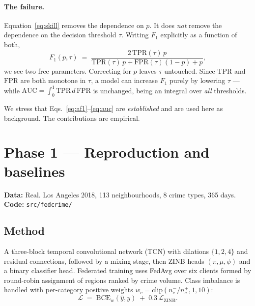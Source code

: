 \documentclass[11pt,a4paper]{article}
\newcommand{\datatag}[2]{%
  \begin{center}\small
  \colorbox{boxbg}{\parbox{0.965\linewidth}{\textbf{Data:} #1 \\ \textbf{Code:} \texttt{#2}}}
  \end{center}}
\begin{document}
\paragraph{The failure.} Equation~\eqref{eq:skill} removes the dependence on
$p$. It does \emph{not} remove the dependence on the decision threshold $\tau$.
Writing $F_1$ explicitly as a function of both,
\begin{equation}
F_1(p,\tau) \;=\; \frac{2\,\mathrm{TPR}(\tau)\,p}{\mathrm{TPR}(\tau)\,p + \mathrm{FPR}(\tau)(1-p) + p},
\label{eq:f1ptau}
\end{equation}
we see two free parameters. Correcting for $p$ leaves $\tau$ untouched. Since
$\mathrm{TPR}$ and $\mathrm{FPR}$ are both monotone in $\tau$, a model can
increase $F_1$ purely by lowering $\tau$ --- while
$\mathrm{AUC} = \int_0^1 \mathrm{TPR}\,d\,\mathrm{FPR}$ is unchanged, being an
integral over \emph{all} thresholds.

\medskip
\noindent{}
\medskip

\noindent We stress that Eqs.~\eqref{eq:af1}--\eqref{eq:auc} are
\emph{established} \cite{davis2006,boyd2012,chouldechova2017} and are used here
as background. The contributions are empirical.

\section{Phase 1 --- Reproduction and baselines}\label{sec:phases1}
\datatag{Real. Los Angeles 2018, 113 neighbourhoods, 8 crime types, 365 days.}{src/fedcrime/}

\subsection{Method}
A three-block temporal convolutional network (TCN) with dilations $\{1,2,4\}$
and residual connections, followed by a mixing stage, then ZINB heads
$(\pi,\mu,\phi)$ and a binary classifier head. Federated training uses FedAvg
over six clients formed by round-robin assignment of regions ranked by crime
volume. Class imbalance is handled with per-category positive weights
$w_c = \mathrm{clip}(n^-_c/n^+_c, 1, 10)$:
\[
\mathcal{L} \;=\; \mathrm{BCE}_{w}(\hat{y}, y) \;+\; 0.3\,\mathcal{L}_{\mathrm{ZINB}}.
\]
\end{document}
